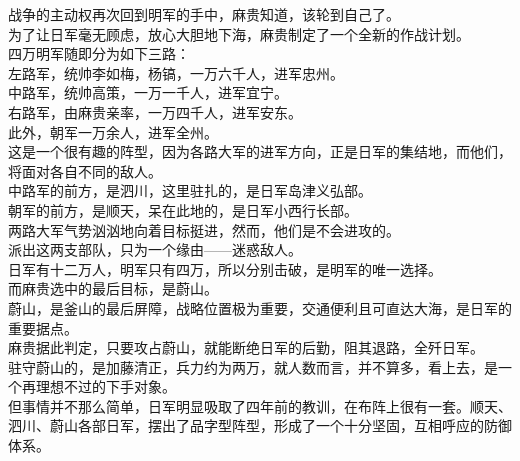 \begin{multicols}{\theparacolNo}
战争的主动权再次回到明军的手中，麻贵知道，该轮到自己了。\\

为了让日军毫无顾虑，放心大胆地下海，麻贵制定了一个全新的作战计划。\\

四万明军随即分为如下三路：\\

左路军，统帅李如梅，杨镐，一万六千人，进军忠州。\\

中路军，统帅高策，一万一千人，进军宜宁。\\

右路军，由麻贵亲率，一万四千人，进军安东。\\

此外，朝军一万余人，进军全州。\\

这是一个很有趣的阵型，因为各路大军的进军方向，正是日军的集结地，而他们，将面对各自不同的敌人。\\

中路军的前方，是泗川，这里驻扎的，是日军岛津义弘部。\\

朝军的前方，是顺天，呆在此地的，是日军小西行长部。\\

两路大军气势汹汹地向着目标挺进，然而，他们是不会进攻的。\\

派出这两支部队，只为一个缘由——迷惑敌人。\\

日军有十二万人，明军只有四万，所以分别击破，是明军的唯一选择。\\

而麻贵选中的最后目标，是蔚山。\\

蔚山，是釜山的最后屏障，战略位置极为重要，交通便利且可直达大海，是日军的重要据点。\\

麻贵据此判定，只要攻占蔚山，就能断绝日军的后勤，阻其退路，全歼日军。\\

驻守蔚山的，是加藤清正，兵力约为两万，就人数而言，并不算多，看上去，是一个再理想不过的下手对象。\\

但事情并不那么简单，日军明显吸取了四年前的教训，在布阵上很有一套。顺天、泗川、蔚山各部日军，摆出了品字型阵型，形成了一个十分坚固，互相呼应的防御体系。\\


\end{multicols}
